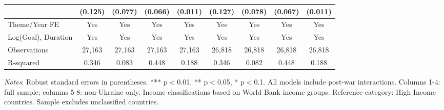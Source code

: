 \begin{table}[htbp]
\begin{threeparttable}
\begin{tabular}{lcccccccc}
 & (0.125) & (0.077) & (0.066) & (0.011) & (0.127) & (0.078) & (0.067) & (0.011) \\
\midrule
Theme/Year FE & Yes & Yes & Yes & Yes & Yes & Yes & Yes & Yes \\
Log(Goal), Duration & Yes & Yes & Yes & Yes & Yes & Yes & Yes & Yes \\
\midrule
Observations & 27,163 & 27,163 & 27,163 & 27,163 & 26,818 & 26,818 & 26,818 & 26,818 \\
R-squared & 0.346 & 0.083 & 0.448 & 0.188 & 0.346 & 0.082 & 0.448 & 0.188 \\
\bottomrule
\end{tabular}
\begin{tablenotes}
\small
\item \textit{Notes}: Robust standard errors in parentheses. *** p$<$0.01, ** p$<$0.05, * p$<$0.1. All models include post-war interactions. Columns 1-4: full sample; columns 5-8: non-Ukraine only. Income classifications based on World Bank income groups. Reference category: High Income countries. Sample excludes unclassified countries.
\end{tablenotes}
\end{threeparttable}
\end{table}

